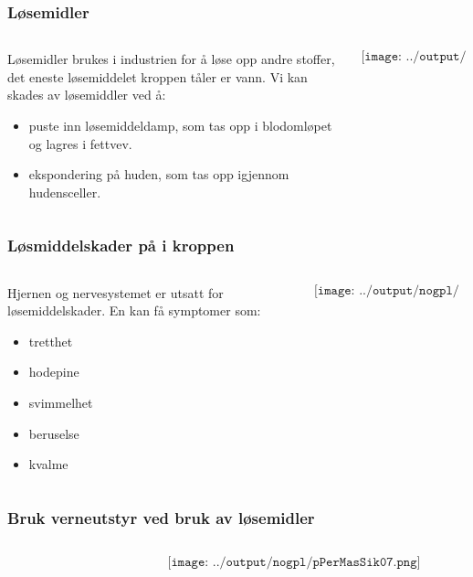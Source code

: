 \documentclass[aspectratio=169,xcolor=dvipsnames]{beamer}
\begin{document}
\begin{frame}
	\frametitle{Løsemidler}
	\begin{columns}
		\begin{column}{0.5\textwidth}

			Løsemidler brukes i industrien for å løse opp andre stoffer, det eneste løsemiddelet kroppen tåler er vann. Vi kan skades av løsemiddler ved å:
			\begin{itemize}
				\item puste inn løsemiddeldamp, som tas opp i blodomløpet og lagres i fettvev. 
				\item ekspondering på huden, som tas opp igjennom hudensceller. 
			\end{itemize}


		\end{column}

		\begin{column}{0.5\textwidth}
	$$\texttt{[image: ../output/nogpl/pPerMasSik05.png]}$$
		\end{column}
	\end{columns}
\end{frame}

\begin{frame}
	\frametitle{Løsmiddelskader på i kroppen}
	\begin{columns}
		\begin{column}{0.5\textwidth}
Hjernen og nervesystemet er utsatt for løsemiddelskader. En kan få symptomer som: 
	\begin{itemize}
		\item tretthet
		\item hodepine
		\item svimmelhet
		\item beruselse
		\item kvalme
	\end{itemize}
		\end{column}

		\begin{column}{0.5\textwidth}
	$$\texttt{[image: ../output/nogpl/pPerMasSik06.png]}$$
		\end{column}
	\end{columns}
\end{frame}

\begin{frame}
	\frametitle{Bruk verneutstyr ved bruk av løsemidler}
	\begin{columns}
		\begin{column}{0.5\textwidth}
			
		\end{column}

		\begin{column}{0.5\textwidth}
	$$\texttt{[image: ../output/nogpl/pPerMasSik07.png]}$$
		\end{column}
	\end{columns}
\end{frame}
\end{document}
